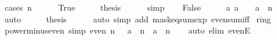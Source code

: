 \begin{isabellebody}
\ {\isacharparenleft}{\kern0pt}cases\ {\isacartoucheopen}n\ {\isacharequal}{\kern0pt}\ {}{\isacartoucheclose}{\isacharparenright}{\kern0pt}\isanewline
\ \ \isamarkupfalse%
\ True\isanewline
\ \ \isamarkupfalse%
\ \isamarkupfalse%
\ {\isacharquery}{\kern0pt}thesis\isanewline
\ \ \ \ \isamarkupfalse%
\ simp\isanewline
{}\isamarkupfalse%
\isanewline
\ \ \isamarkupfalse%
\ False\isanewline
\ \ \isamarkupfalse%
\ \isamarkupfalse%
\ {\isacartoucheopen}{\isacharbraceleft}{\kern0pt}a{\isachardot}{\kern0pt}\ a\ {\isacharequal}{\kern0pt}\ {}\ {\isasymand}\ a\ {\isacharless}{\kern0pt}\ n{\isacharbraceright}{\kern0pt}\ {\isacharequal}{\kern0pt}\ {\isacharbraceleft}{\kern0pt}{}{\isacharbraceright}{\kern0pt}{\isacartoucheclose}\isanewline
\ \ \ \ \isamarkupfalse%
\ auto\isanewline
\ \ \isamarkupfalse%
\ \isamarkupfalse%
\ {\isacharquery}{\kern0pt}thesis\isanewline
\ \ \ \ \isamarkupfalse%
\ {\isacharparenleft}{\kern0pt}auto\ simp\ add{\isacharcolon}{\kern0pt}\ mask{\isacharunderscore}{\kern0pt}eq{\isacharunderscore}{\kern0pt}sum{\isacharunderscore}{\kern0pt}exp\ even{\isacharunderscore}{\kern0pt}sum{\isacharunderscore}{\kern0pt}iff{\isacharparenright}{\kern0pt}\isanewline
{}\isamarkupfalse%
%
\endisatagproof
{\isafoldproof}%
%
\isadelimproof
\isanewline
%
\endisadelimproof
\isanewline
{}\isamarkupfalse%
%
\isadelimdocument
%
\endisadelimdocument
%
\isatagdocument
%
\isamarkuptrue%
%
\endisatagdocument
{\isafolddocument}%
%
\isadelimdocument
%
\endisadelimdocument
{}\isamarkupfalse%
\ ring{\isacharunderscore}{\kern0pt}{}\isanewline
{}\isanewline
\isanewline
{}\isamarkupfalse%
\ power{\isacharunderscore}{\kern0pt}minus{\isacharunderscore}{\kern0pt}even\ {\isacharbrackleft}{\kern0pt}simp{\isacharbrackright}{\kern0pt}{\isacharcolon}{\kern0pt}\ {\isachardoublequoteopen}even\ n\ {\isasymLongrightarrow}\ {\isacharparenleft}{\kern0pt}{\isacharminus}{\kern0pt}\ a{\isacharparenright}{\kern0pt}\ {\isacharcircum}{\kern0pt}\ n\ {\isacharequal}{\kern0pt}\ a\ {\isacharcircum}{\kern0pt}\ n{\isachardoublequoteclose}\isanewline
%
\isadelimproof
\ \ %
\endisadelimproof
%
\isatagproof
{}\isamarkupfalse%
\ {\isacharparenleft}{\kern0pt}auto\ elim{\isacharcolon}{\kern0pt}\ evenE{\isacharparenright}{\kern0pt}%
\endisatagproof

\end{isabellebody}
